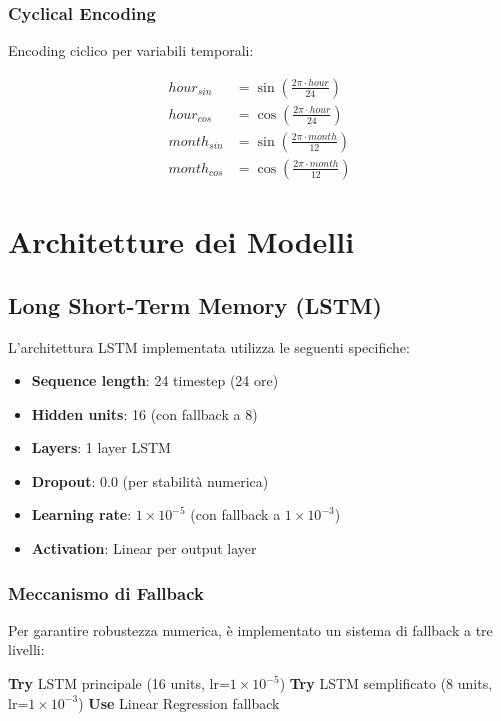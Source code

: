 \documentclass[12pt,a4paper,twoside]{report}
\begin{document}
\subsubsection{Cyclical Encoding}

Encoding ciclico per variabili temporali:

\begin{align}
hour_{sin} &= \sin\left(\frac{2\pi \cdot hour}{24}\right) \\
hour_{cos} &= \cos\left(\frac{2\pi \cdot hour}{24}\right) \\
month_{sin} &= \sin\left(\frac{2\pi \cdot month}{12}\right) \\
month_{cos} &= \cos\left(\frac{2\pi \cdot month}{12}\right)
\end{align}

\section{Architetture dei Modelli}

\subsection{Long Short-Term Memory (LSTM)}

L'architettura LSTM implementata utilizza le seguenti specifiche:

\begin{itemize}
    \item \textbf{Sequence length}: 24 timestep (24 ore)
    \item \textbf{Hidden units}: 16 (con fallback a 8)
    \item \textbf{Layers}: 1 layer LSTM
    \item \textbf{Dropout}: 0.0 (per stabilità numerica)
    \item \textbf{Learning rate}: $1 \times 10^{-5}$ (con fallback a $1 \times 10^{-3}$)
    \item \textbf{Activation}: Linear per output layer
\end{itemize}

\subsubsection{Meccanismo di Fallback}

Per garantire robustezza numerica, è implementato un sistema di fallback a tre livelli:

\begin{algorithm}
\caption{LSTM Fallback Mechanism}
\begin{algorithmic}[1]
\STATE \textbf{Try} LSTM principale (16 units, lr=$1 \times 10^{-5}$)
    \STATE \textbf{Try} LSTM semplificato (8 units, lr=$1 \times 10^{-3}$)
        \STATE \textbf{Use} Linear Regression fallback
    \ENDIF
\ENDIF
\end{algorithmic}
\end{algorithm}
\end{document}
